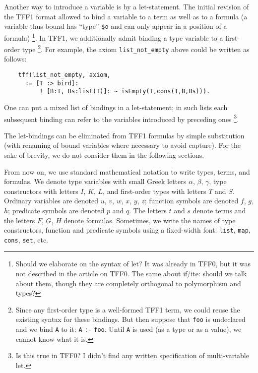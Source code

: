 Another way to introduce a variable is by a let-statement.
The initial revision of the TFF1 format allowed to bind a variable
to a term as well as to a formula (a variable thus bound has
``type'' \verb+$o+ and can only appear in a position of a formula)%
\footnote{Should we elaborate on the syntax of let?
It was already in TFF0, but it was not described in
the article on TFF0. The same about if/ite: should
we talk about them, though they are completely
orthogonal to polymorphism and types?}.
In TFF1, we additionally admit binding a type variable
to a first-order type%
\footnote{Since any first-order type is a well-formed TFF1 term,
we could reuse the existing syntax for these bindings.
But then suppose that {\tt foo} is undeclared and
we bind {\tt A} to it: {\tt A} {\tt :-} {\tt foo}.
Until {\tt A} is used
(as a type or as a value), we cannot know what it is.}.
For example,
the axiom \verb+list_not_empty+ above could be written as
follows:
\begin{verbatim}
    tff(list_not_empty, axiom,
      := [T :> bird]:
          ! [B:T, Bs:list(T)]: ~ isEmpty(T,cons(T,B,Bs))).
\end{verbatim}
One can put a mixed list of bindings in a let-statement;
in such lists each subsequent binding can refer
to the variables introduced by preceding ones%
\footnote{Is this true in TFF0? I didn't find any written
specification of multi-variable let.}.

The let-bindings can be eliminated from TFF1 formulas by simple
substitution (with renaming of bound variables where necessary
to avoid capture). For the sake of brevity, we do not consider
them in the following sections.

 From now on, we use standard
mathematical notation to write types, terms, and formulas.
We denote type variables with small Greek letters
$\alpha$, $\beta$, $\gamma$, type constructors
with letters $I$, $K$, $L$, and first-order
types with letters $T$ and $S$. Ordinary variables
are denoted $u$, $v$, $w$, $x$, $y$, $z$; function
symbols are denoted $f$, $g$, $h$; predicate symbols
are denoted $p$ and $q$. The letters $t$ and $s$ denote
terms and the letters $F$, $G$, $H$ denote formulas.
Sometimes, we write the names of type constructors,
function and predicate symbols using a fixed-width
font: {\tt list}, {\tt map}, {\tt cons}, {\tt set},
etc.

